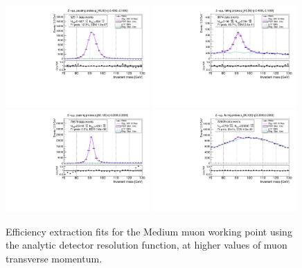 {\begin{figure}
\centering
\includegraphics[width=0.49\textwidth]{figures/Zmm_ResFunc_BkgLPi_pass_ptBin7_etaBin0.pdf}
\includegraphics[width=0.49\textwidth]{figures/Zmm_ResFunc_BkgLPi_fail_ptBin7_etaBin0.pdf}
\includegraphics[width=0.49\textwidth]{figures/Zmm_ResFunc_BkgLPi_pass_ptBin10_etaBin6.pdf}
\includegraphics[width=0.49\textwidth]{figures/Zmm_ResFunc_BkgLPi_fail_ptBin10_etaBin6.pdf}
\caption{Efficiency extraction fits for the Medium muon working point using the analytic detector resolution function, at higher values of muon transverse momentum.}
\label{fig:ZmmAltSigResFits2}
\end{figure}

}
